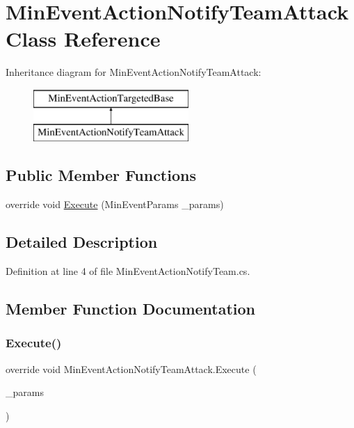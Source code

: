 \hypertarget{class_min_event_action_notify_team_attack}{}\section{Min\+Event\+Action\+Notify\+Team\+Attack Class Reference}
\label{class_min_event_action_notify_team_attack}
Inheritance diagram for Min\+Event\+Action\+Notify\+Team\+Attack\+:\begin{figure}[H]
\begin{center}
\leavevmode
\includegraphics[height=2.000000cm]{d2/d72/class_min_event_action_notify_team_attack}
\end{center}
\end{figure}
\subsection*{Public Member Functions}
\begin{DoxyCompactItemize}
\item 
override void \mbox{\hyperlink{class_min_event_action_notify_team_attack_a36c05106d336c761e6aee48599156be3}{Execute}} (Min\+Event\+Params \+\_\+params)
\end{DoxyCompactItemize}


\subsection{Detailed Description}


Definition at line 4 of file Min\+Event\+Action\+Notify\+Team.\+cs.



\subsection{Member Function Documentation}
\mbox{\label{class_min_event_action_notify_team_attack_a36c05106d336c761e6aee48599156be3}} 
\subsubsection{\texorpdfstring{Execute()}{Execute()}}
{\footnotesize\ttfamily override void Min\+Event\+Action\+Notify\+Team\+Attack.\+Execute (\begin{DoxyParamCaption}\item[{Min\+Event\+Params}]{\+\_\+params }\end{DoxyParamCaption})}



